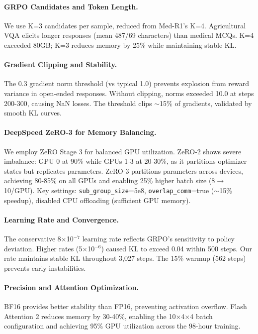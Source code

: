 \documentclass[11pt]{article}
\begin{document}
\paragraph{GRPO Candidates and Token Length.}
We use K=3 candidates per sample, reduced from Med-R1's K=4. Agricultural VQA elicits longer responses (mean 487/69 characters) than medical MCQs. K=4 exceeded 80GB; K=3 reduces memory by 25\% while maintaining stable KL.

\paragraph{Gradient Clipping and Stability.}
The 0.3 gradient norm threshold (vs typical 1.0) prevents explosion from reward variance in open-ended responses. Without clipping, norms exceeded 10.0 at steps 200-300, causing NaN losses. The threshold clips $\sim$15\% of gradients, validated by smooth KL curves.

\paragraph{DeepSpeed ZeRO-3 for Memory Balancing.}
We employ ZeRO Stage 3 for balanced GPU utilization. ZeRO-2 shows severe imbalance: GPU 0 at 90\% while GPUs 1-3 at 20-30\%, as it partitions optimizer states but replicates parameters. ZeRO-3 partitions parameters across devices, achieving 80-85\% on all GPUs and enabling 25\% higher batch size (8$\rightarrow$10/GPU). Key settings: \texttt{sub\_group\_size}=5e8, \texttt{overlap\_comm}=true ($\sim$15\% speedup), disabled CPU offloading (sufficient GPU memory).

\paragraph{Learning Rate and Convergence.}
The conservative 8×10$^{-7}$ learning rate reflects GRPO's sensitivity to policy deviation. Higher rates (5×10$^{-6}$) caused KL to exceed 0.04 within 500 steps. Our rate maintains stable KL throughout 3,027 steps. The 15\% warmup (562 steps) prevents early instabilities.

\paragraph{Precision and Attention Optimization.}
BF16 provides better stability than FP16, preventing activation overflow. Flash Attention 2 reduces memory by 30-40\%, enabling the 10×4×4 batch configuration and achieving 95\% GPU utilization across the 98-hour training.
\end{document}
